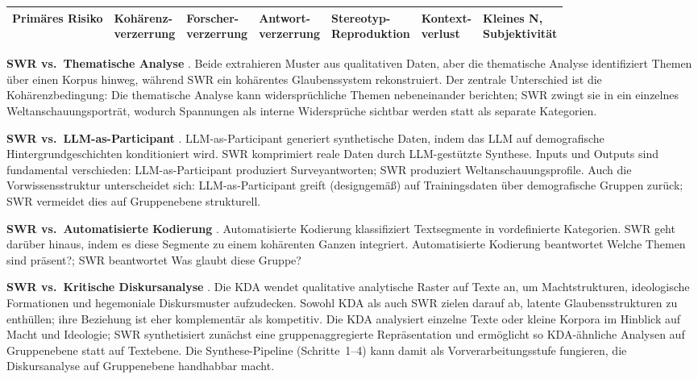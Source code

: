 \documentclass[11pt,a4paper]{article}
\begin{document}
\begin{table}[htbp]
{\begin{tabular}{@{} l l l l l l l @{}}
    Primäres Risiko & \shortstack[l]{Kohärenz-\\verzerrung} & \shortstack[l]{Forscher-\\verzerrung} & \shortstack[l]{Antwort-\\verzerrung} & \shortstack[l]{Stereotyp-\\Reproduktion} & \shortstack[l]{Kontext-\\verlust} & \shortstack[l]{Kleines N,\\Subjektivität} \\
    \bottomrule
  \end{tabular}}
\end{table}

\textbf{SWR vs.\ Thematische Analyse} \citep{Braun2006}. Beide extrahieren Muster aus qualitativen Daten, aber die thematische Analyse identifiziert Themen über einen Korpus hinweg, während SWR ein kohärentes Glaubenssystem rekonstruiert. Der zentrale Unterschied ist die Kohärenzbedingung: Die thematische Analyse kann widersprüchliche Themen nebeneinander berichten; SWR zwingt sie in ein einzelnes Weltanschauungsporträt, wodurch Spannungen als interne Widersprüche sichtbar werden statt als separate Kategorien.

\textbf{SWR vs.\ LLM-as-Participant} \citep{Argyle2023}. LLM-as-Participant generiert synthetische Daten, indem das LLM auf demografische Hintergrundgeschichten konditioniert wird. SWR komprimiert reale Daten durch LLM-gestützte Synthese. Inputs und Outputs sind fundamental verschieden: LLM-as-Participant produziert Surveyantworten; SWR produziert Weltanschauungsprofile. Auch die Vorwissensstruktur unterscheidet sich: LLM-as-Participant greift (designgemäß) auf Trainingsdaten über demografische Gruppen zurück; SWR vermeidet dies auf Gruppenebene strukturell.

\textbf{SWR vs.\ Automatisierte Kodierung} \citep{Tai2024}. Automatisierte Kodierung klassifiziert Textsegmente in vordefinierte Kategorien. SWR geht darüber hinaus, indem es diese Segmente zu einem kohärenten Ganzen integriert. Automatisierte Kodierung beantwortet \glqq{}Welche Themen sind präsent?\grqq{}; SWR beantwortet \glqq{}Was glaubt diese Gruppe?\grqq{}

\textbf{SWR vs.\ Kritische Diskursanalyse} \citep[KDA;][]{Fairclough1992, Wodak2001}. Die KDA wendet qualitative analytische Raster auf Texte an, um Machtstrukturen, ideologische Formationen und hegemoniale Diskursmuster aufzudecken. Sowohl KDA als auch SWR zielen darauf ab, latente Glaubensstrukturen zu enthüllen; ihre Beziehung ist eher komplementär als kompetitiv. Die KDA analysiert einzelne Texte oder kleine Korpora im Hinblick auf Macht und Ideologie; SWR synthetisiert zunächst eine gruppenaggregierte Repräsentation und ermöglicht so KDA-ähnliche Analysen auf Gruppenebene statt auf Textebene. Die Synthese-Pipeline (Schritte~1--4) kann damit als Vorverarbeitungsstufe fungieren, die Diskursanalyse auf Gruppenebene handhabbar macht.
\end{document}
